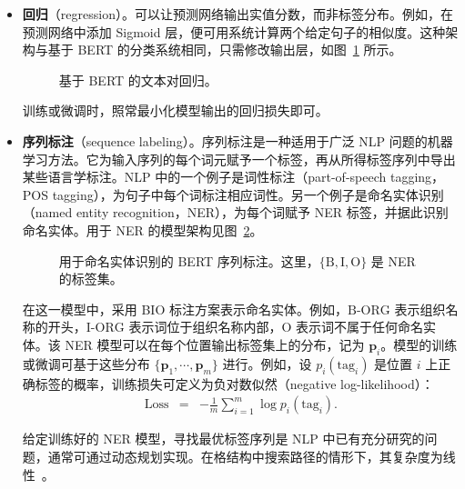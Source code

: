 \begin{itemize}
\item \vspace{0.3em} \textbf{回归}（regression）。可以让预测网络输出实值分数，而非标签分布。例如，在预测网络中添加 Sigmoid 层，便可用系统计算两个给定句子的相似度。这种架构与基于 BERT 的分类系统相同，只需修改输出层，如图~\ref{fig:bert-app-regression-two-texts} 所示。

\begin{figure}[!ht]
\centering

\caption{基于 BERT 的文本对回归。}
\label{fig:bert-app-regression-two-texts}
\end{figure}

    训练或微调时，照常最小化模型输出的回归损失即可。

\item \vspace{0.3em} \textbf{序列标注}（sequence labeling）。序列标注是一种适用于广泛 NLP 问题的机器学习方法。它为输入序列的每个词元赋予一个标签，再从所得标签序列中导出某些语言学标注。NLP 中的一个例子是词性标注（part-of-speech tagging，POS tagging），为句子中每个词标注相应词性。另一个例子是命名实体识别（named entity recognition，NER），为每个词赋予 NER 标签，并据此识别命名实体。用于 NER 的模型架构见图~\ref{fig:bert-app-sequence-labeling}。

\begin{figure}[!ht]
\centering

\caption{用于命名实体识别的 BERT 序列标注。这里，$\{\mathrm{B}, \mathrm{I}, \mathrm{O}\}$ 是 NER 的标签集。}
\label{fig:bert-app-sequence-labeling}
\end{figure}

    \noindent 在这一模型中，采用 BIO 标注方案表示命名实体。例如，$\mathrm{B}\textrm{-}\mathrm{ORG}$ 表示组织名称的开头，$\mathrm{I}\textrm{-}\mathrm{ORG}$ 表示词位于组织名称内部，$\mathrm{O}$ 表示词不属于任何命名实体。该 NER 模型可以在每个位置输出标签集上的分布，记为 $\mathbf{p}_i$。模型的训练或微调可基于这些分布 $\{\mathbf{p}_1,\cdots,\mathbf{p}_m\}$ 进行。例如，设 $p_i(\mathrm{tag}_i)$ 是位置 $i$ 上正确标签的概率，训练损失可定义为负对数似然（negative log-likelihood）：
    \begin{eqnarray}
    \mathrm{Loss} & = & -\frac{1}{m} \sum_{i=1}^{m} \log p_i(\mathrm{tag}_i).
    \end{eqnarray}

    给定训练好的 NER 模型，寻找最优标签序列是 NLP 中已有充分研究的问题，通常可通过动态规划实现。在格结构中搜索路径的情形下，其复杂度为线性~\cite{huang-etal:2009dynamic}。


\end{itemize}
